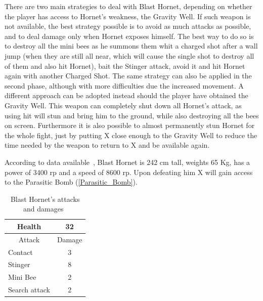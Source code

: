There are two main strategies to deal with Blast Hornet, depending on whether the player has access to Hornet's weakness, the Gravity Well. If such weapon is not available, the best strategy possible is to avoid as much attacks as possible, and to deal damage only when Hornet exposes himself. The best way to do so is to destroy all the mini bees as he summons them whit a charged shot after a wall jump (when they are still all near, which will cause the single shot to destroy all of them and also hit Hornet), bait the Stinger attack, avoid it and hit Hornet again with another Charged Shot. The same strategy can also be applied in the second phase, although with more difficulties due the increased movement. A different approach can be adopted instead should the player have obtained the Gravity Well. This weapon can completely shut down all Hornet's attack, as using hit will stun and bring him to the ground, while also destroying all the bees on screen. Furthermore it is also possible to almost permanently stun Hornet for the whole fight, just by putting X close enough to the Gravity Well to reduce the time needed by the weapon to return to X and be available again.

According to data available~\cite{wayback:X3_resources}, Blast Hornet is 242 cm tall, weights 65 Kg, has a power of 3400 rp and a speed of 8600 rp. Upon defeating him X will gain access to the Parasitic Bomb (\ref{Parasitic_Bomb}).
\begin{table}[htp]
	\centering
	\begin{tabular}[h]{l c}
		\toprule
		\multicolumn{1}{c}{Health}  & 32\\
		\midrule
		\multicolumn{1}{c}{Attack} & \multicolumn{1}{c}{Damage}\\
		Contact & 3 \\
		Stinger & 8 \\
		Mini Bee& 2\\
		Search attack& 2\\
		\bottomrule
	\end{tabular}
	\caption{Blast Hornet's attacks and damages~\cite{book:Compendium,wiki:Blast_hornet}}
\end{table}


